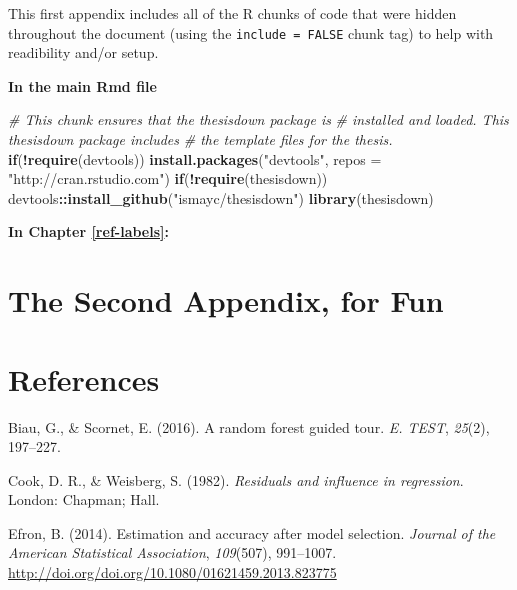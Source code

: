 \documentclass[12pt,twoside]{reedthesis}
\newenvironment{Shaded}{\begin{snugshade}}{\end{snugshade}}
\newcommand{\KeywordTok}[1]{\textcolor[rgb]{0.13,0.29,0.53}{\textbf{#1}}}
\newcommand{\DataTypeTok}[1]{\textcolor[rgb]{0.13,0.29,0.53}{#1}}
\newcommand{\StringTok}[1]{\textcolor[rgb]{0.31,0.60,0.02}{#1}}
\newcommand{\CommentTok}[1]{\textcolor[rgb]{0.56,0.35,0.01}{\textit{#1}}}
\newcommand{\ControlFlowTok}[1]{\textcolor[rgb]{0.13,0.29,0.53}{\textbf{#1}}}
\newcommand{\OperatorTok}[1]{\textcolor[rgb]{0.81,0.36,0.00}{\textbf{#1}}}
\newcommand{\NormalTok}[1]{#1}
\theoremstyle{definition}
\theoremstyle{definition}
\theoremstyle{definition}
\theoremstyle{remark}
\begin{document}
This first appendix includes all of the R chunks of code that were
hidden throughout the document (using the \texttt{include\ =\ FALSE}
chunk tag) to help with readibility and/or setup.

\textbf{In the main Rmd file}
\begin{Shaded}
\begin{Highlighting}[]
\CommentTok{# This chunk ensures that the thesisdown package is}
\CommentTok{# installed and loaded. This thesisdown package includes}
\CommentTok{# the template files for the thesis.}
\ControlFlowTok{if}\NormalTok{(}\OperatorTok{!}\KeywordTok{require}\NormalTok{(devtools))}
  \KeywordTok{install.packages}\NormalTok{(}\StringTok{"devtools"}\NormalTok{, }\DataTypeTok{repos =} \StringTok{"http://cran.rstudio.com"}\NormalTok{)}
\ControlFlowTok{if}\NormalTok{(}\OperatorTok{!}\KeywordTok{require}\NormalTok{(thesisdown))}
\NormalTok{  devtools}\OperatorTok{::}\KeywordTok{install_github}\NormalTok{(}\StringTok{"ismayc/thesisdown"}\NormalTok{)}
\KeywordTok{library}\NormalTok{(thesisdown)}
\end{Highlighting}
\end{Shaded}
\textbf{In Chapter \ref{ref-labels}:}

\chapter{The Second Appendix, for
Fun}\label{the-second-appendix-for-fun}

\backmatter

\chapter*{References}\label{references}


\noindent

\setlength{\parindent}{-0.20in} \setlength{\leftskip}{0.20in}
\setlength{\parskip}{8pt}

\hypertarget{refs}{}
\hypertarget{ref-biau2015a}{}
Biau, G., \& Scornet, E. (2016). A random forest guided tour. \emph{E.
TEST}, \emph{25}(2), 197--227.

\hypertarget{ref-cook1982}{}
Cook, D. R., \& Weisberg, S. (1982). \emph{Residuals and influence in
regression}. London: Chapman; Hall.

\hypertarget{ref-efron2014}{}
Efron, B. (2014). Estimation and accuracy after model selection.
\emph{Journal of the American Statistical Association}, \emph{109}(507),
991--1007. \url{http://doi.org/doi.org/10.1080/01621459.2013.823775}
\end{document}
